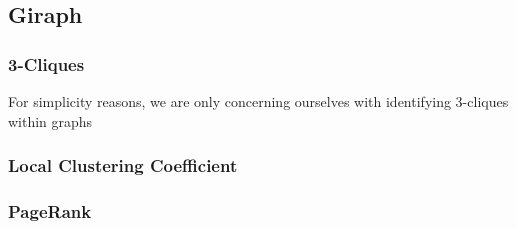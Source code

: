 \subsection{Giraph}

\subsubsection{3-Cliques}
For simplicity reasons, we are only concerning ourselves with identifying 3-cliques within graphs

\subsubsection{Local Clustering Coefficient}

\subsubsection{PageRank}


